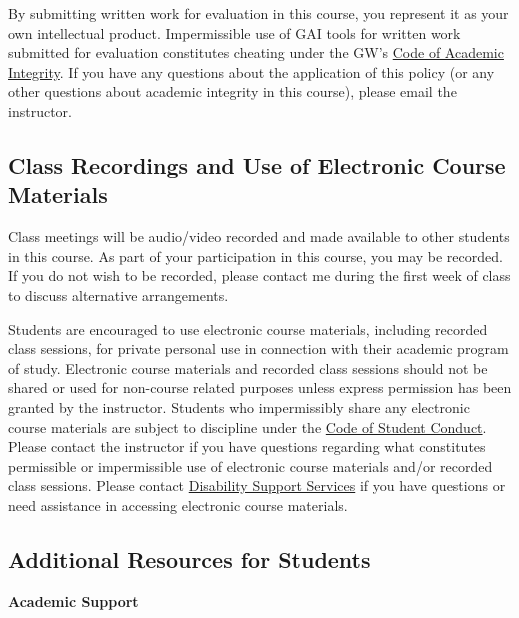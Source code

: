 \documentclass[12pt,letterpaper]{article}
\begin{document}
By submitting written work for evaluation in this course, you
represent it as your own intellectual product. Impermissible use of
GAI tools for written work submitted for evaluation constitutes
cheating under the GW's
\href{https://students.gwu.edu/code-academic-integrity}{Code of
Academic Integrity}. If you have any questions about the application
of this policy (or any other questions about academic integrity in
this course), please email the instructor.

\subsection*{Class Recordings and Use of Electronic Course Materials}

Class meetings will be audio/video recorded and made available to
other students in this course. As part of your participation in this
course, you may be recorded. If you do not wish to be recorded,
please contact me during the first week of class to discuss
alternative arrangements. \par

Students are encouraged to use electronic course materials, including
recorded class sessions, for private personal use in connection with
their academic program of study. Electronic course materials and
recorded class sessions should not be shared or used for non-course
related purposes unless express permission has been granted by the
instructor. Students who impermissibly share any electronic course
materials are subject to discipline under the
\href{https://studentconduct.gwu.edu/code-student-conduct}{Code of
Student Conduct}. Please contact the instructor if you have questions
regarding what constitutes permissible or impermissible use of
electronic course materials and/or recorded class sessions. Please
contact \href{https://disabilitysupport.gwu.edu/}{Disability Support
Services} if you have questions or need assistance in accessing
electronic course materials.

\subsection*{Additional Resources for Students}

\textbf{Academic Support}
\end{document}
